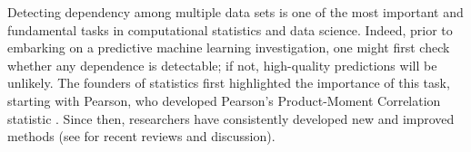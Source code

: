 \documentclass[11pt]{article}
\begin{document}


{}



Detecting dependency among multiple data sets is one of the most important and fundamental tasks in computational statistics and data science.
Indeed, prior to embarking on a predictive machine learning investigation, one might first check whether any dependence is detectable; if not, high-quality predictions will be unlikely.
The founders of statistics first highlighted the importance of this task, starting with Pearson, who developed Pearson's Product-Moment Correlation statistic  \cite{Pearson1895}.  Since then, researchers have consistently developed new and improved methods (see \cite{Reimherr2013,JosseHolmes2013} for  recent reviews and discussion).
\end{document}
